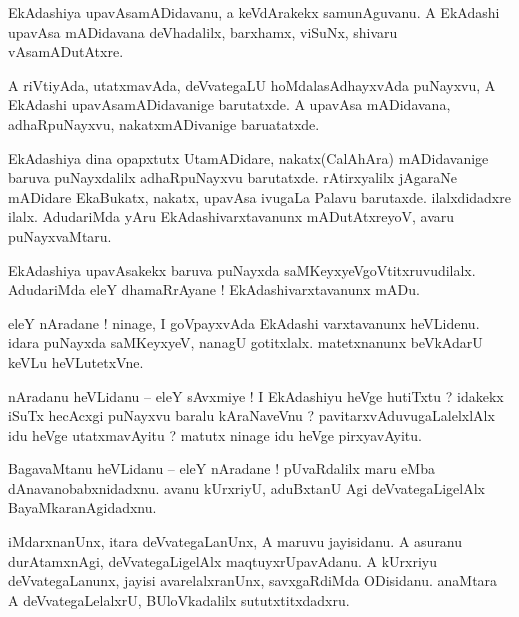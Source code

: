 \documentclass{article}
\begin{document}
\begin{mn}%
EkAdashiya upavAsamADidavanu, a keVdArakekx samunAguvanu. A EkAdashi upavAsa mADidavana 
deVhadalilx, barxhamx, viSuNx, shivaru vAsamADutAtxre.
\end{mn}

\begin{mn}%
A riVtiyAda, utatxmavAda, deVvategaLU hoMdalasAdhayxvAda puNayxvu, A EkAdashi upavAsamADidavanige 
barutatxde. A upavAsa mADidavana, adhaRpuNayxvu, nakatxmADivanige baruatatxde.
\end{mn}

\begin{mn}%
EkAdashiya dina opapxtutx UtamADidare, nakatx(CalAhAra) mADidavanige baruva puNayxdalilx 
adhaRpuNayxvu barutatxde. rAtirxyalilx jAgaraNe mADidare EkaBukatx, nakatx, upavAsa ivugaLa Palavu 
barutaxde. ilalxdidadxre ilalx. AdudariMda yAru EkAdashivarxtavanunx mADutAtxreyoV, avaru 
puNayxvaMtaru.
\end{mn}

\begin{mn}%
EkAdashiya upavAsakekx baruva puNayxda saMKeyxyeVgoVtitxruvudilalx. AdudariMda eleY dhamaRrAyane ! 
EkAdashivarxtavanunx mADu.
\end{mn}

\begin{mn}%
eleY nAradane ! ninage, I goVpayxvAda EkAdashi varxtavanunx heVLidenu. idara puNayxda saMKeyxyeV, 
nanagU gotitxlalx. matetxnanunx beVkAdarU keVLu heVLutetxVne.
\end{mn}

\begin{mn}%
nAradanu heVLidanu -- eleY sAvxmiye ! I EkAdashiyu heVge hutiTxtu ? idakekx iSuTx hecAcxgi puNayxvu 
baralu kAraNaveVnu ? pavitarxvAduvugaLalelxlAlx idu heVge utatxmavAyitu ? matutx ninage idu heVge 
pirxyavAyitu.
\end{mn}

\begin{mn}%
BagavaMtanu heVLidanu -- eleY nAradane ! pUvaRdalilx maru eMba dAnavanobabxnidadxnu. avanu 
kUrxriyU, aduBxtanU Agi deVvategaLigelAlx BayaMkaranAgidadxnu.
\end{mn}

\begin{mn}%
iMdarxnanUnx, itara deVvategaLanUnx, A maruvu jayisidanu. A asuranu durAtamxnAgi, deVvategaLigelAlx 
maqtuyxrUpavAdanu. A kUrxriyu deVvategaLanunx, jayisi avarelalxranUnx, savxgaRdiMda ODisidanu. 
anaMtara A deVvategaLelalxrU, BUloVkadalilx sututxtitxdadxru.
\end{mn}
\end{document}
